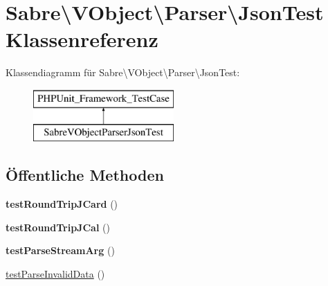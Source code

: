 \hypertarget{class_sabre_1_1_v_object_1_1_parser_1_1_json_test}{}\section{Sabre\textbackslash{}V\+Object\textbackslash{}Parser\textbackslash{}Json\+Test Klassenreferenz}
\label{class_sabre_1_1_v_object_1_1_parser_1_1_json_test}
Klassendiagramm für Sabre\textbackslash{}V\+Object\textbackslash{}Parser\textbackslash{}Json\+Test\+:\begin{figure}[H]
\begin{center}
\leavevmode
\includegraphics[height=2.000000cm]{class_sabre_1_1_v_object_1_1_parser_1_1_json_test}
\end{center}
\end{figure}
\subsection*{Öffentliche Methoden}
\begin{DoxyCompactItemize}
\item 
\mbox{\label{class_sabre_1_1_v_object_1_1_parser_1_1_json_test_a3b6fe8716aa5c31119e7c247c85462bb}} 
{\bfseries test\+Round\+Trip\+J\+Card} ()
\item 
\mbox{\label{class_sabre_1_1_v_object_1_1_parser_1_1_json_test_abc55036fceadfec528c850c9ae928b75}} 
{\bfseries test\+Round\+Trip\+J\+Cal} ()
\item 
\mbox{\label{class_sabre_1_1_v_object_1_1_parser_1_1_json_test_aeeb06eddfbabddb548d399a108edc591}} 
{\bfseries test\+Parse\+Stream\+Arg} ()
\item 
\mbox{\hyperlink{class_sabre_1_1_v_object_1_1_parser_1_1_json_test_a07ef8a1e1dfaa6109de4407a6d124c7e}{test\+Parse\+Invalid\+Data}} ()
\end{DoxyCompactItemize}


